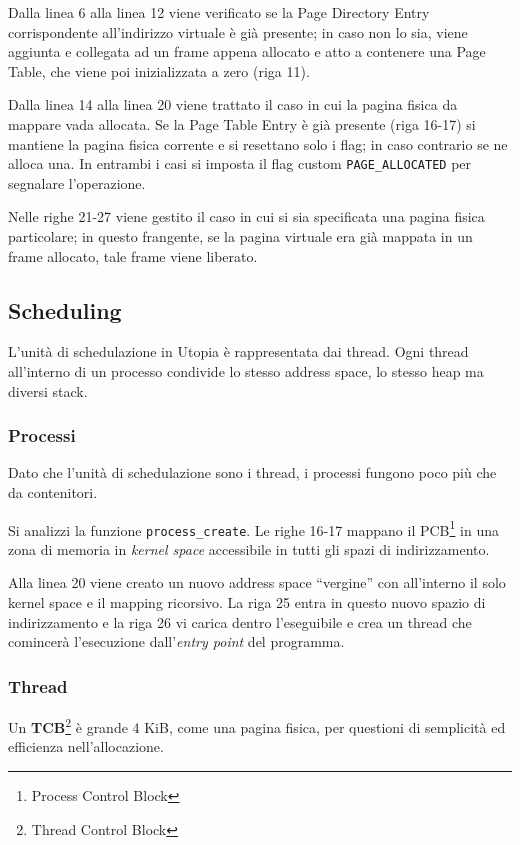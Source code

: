 \documentclass[12pt,a4paper]{report}
\newcommand{\vir}[1]{``#1''}
\begin{document}
			Dalla linea 6 alla linea 12 viene verificato se la Page Directory Entry corrispondente
			all'indirizzo virtuale è già presente; in caso non lo sia, viene aggiunta e collegata ad
			un frame appena allocato e atto a contenere una Page Table, che viene poi inizializzata a zero (riga 11).
			
			Dalla linea 14 alla linea 20 viene trattato il caso in cui la pagina fisica da mappare vada allocata.
			Se la Page Table Entry è già presente (riga 16-17) si mantiene la pagina fisica corrente e si
			resettano solo i flag; in caso contrario se ne alloca una. In entrambi i casi si imposta il flag custom
			\texttt{PAGE\_ALLOCATED} per segnalare l'operazione.
			
			Nelle righe 21-27 viene gestito il caso in cui si sia specificata una pagina fisica particolare;
			in questo frangente, se la pagina virtuale era già mappata in un frame allocato, tale frame
			viene liberato.
			
		\subsection{Scheduling}
			L'unità di schedulazione in Utopia è rappresentata dai thread. Ogni thread all'interno di un processo
			condivide lo stesso address space, lo stesso heap ma diversi stack.
		
			\subsubsection{Processi}
				Dato che l'unità di schedulazione sono i thread, i processi fungono poco più che da contenitori.
								
				
			
				Si analizzi la funzione \texttt{process\_create}. Le righe 16-17 mappano il PCB\footnote{Process Control Block}
				in una zona di memoria in \emph{kernel space} accessibile in tutti gli spazi di indirizzamento.
			
				Alla linea 20 viene creato un nuovo address space \vir{vergine} con all'interno il solo kernel space e
				il mapping ricorsivo. La riga 25 entra in questo nuovo spazio di indirizzamento e la riga 26 vi carica
				dentro l'eseguibile e crea un thread che comincerà l'esecuzione dall'\emph{entry point} del programma.
				
			\subsubsection{Thread}
				Un \textbf{TCB}\footnote{Thread Control Block} è grande 4 KiB, come una pagina fisica, per questioni di semplicità ed efficienza
				nell'allocazione.
			
\end{document}
